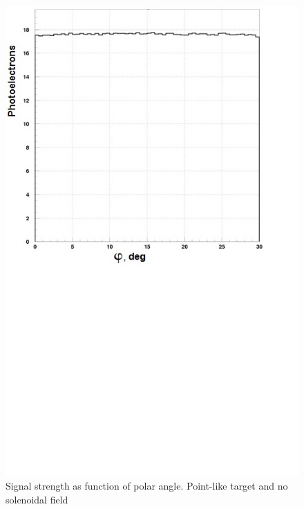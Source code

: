 \begin{figure}[!h]
    \centering
    \includegraphics[width=1.0\linewidth,trim={0.0cm 9.4cm 0.0cm 0.0cm},clip]{images/Point_Targ_Zero_Field_Phi.jpg}
    \caption{Signal strength as function of polar angle. Point-like target and no solenoidal field}
    \label{fig:Point_Targ_Zero_Field_Phi}
\end{figure}

